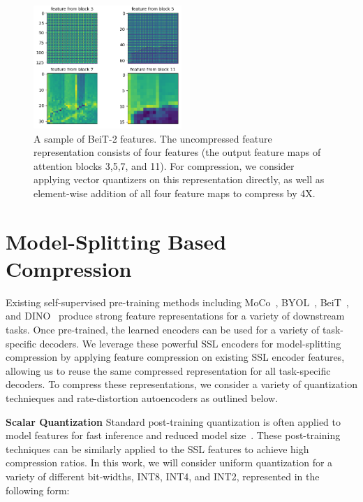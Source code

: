 \documentclass[10pt,twocolumn,letterpaper]{article}
\begin{document}
\begin{figure}
\begin{center}
\includegraphics[width=0.5\textwidth]{Figures/img0_patch0.png}
\end{center}
\caption{\label{fig:beit-features}%
A sample of BeiT-2 features. The uncompressed feature representation consists of four features (the output feature maps of attention blocks 3,5,7, and 11). For compression, we consider applying vector quantizers on this representation directly, as well as element-wise addition of all four feature maps to compress by 4X.}
\end{figure}

\section{Model-Splitting Based Compression}

Existing self-supervised pre-training methods including MoCo~\cite{chen2021empirical}, BYOL~\cite{grill2020bootstrap}, BeiT~\cite{peng2022beit}, and DINO~\cite{oquab2023dinov2} produce strong feature representations for a variety of downstream tasks. Once pre-trained, the learned encoders can be used for a variety of task-specific decoders. We leverage these powerful SSL encoders for model-splitting compression by applying feature compression on existing SSL encoder features, allowing us to reuse the same compressed representation for all task-specific decoders. To compress these representations, we consider a variety of quantization technieques and rate-distortion autoencoders as outlined below. 

\textbf{Scalar Quantization} Standard post-training quantization is often applied to model features for fast inference and reduced model size~\cite{wu2020integer}. These post-training techniques can be similarly applied to the SSL features to achieve high compression ratios. In this work, we will consider uniform quantization for a variety of different bit-widths, INT8, INT4, and INT2, represented in the following form:
\end{document}
